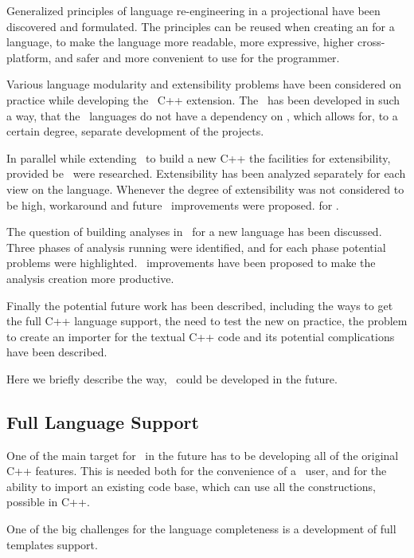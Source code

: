 Generalized principles of language re-engineering in a projectional  have been
discovered and formulated. The principles can be reused when creating an  for 
a language, to make the language more readable, more expressive, higher cross-platform,
and safer and more convenient to use for the programmer. 

Various language modularity and extensibility problems have been considered on 
practice while developing the \mbdr\ C++ extension. The \pcpp\ has been developed in 
such a way, that the \mbdp\ languages do not have a dependency on \pcpp, which
allows for, to a certain degree, separate development of the projects.

In parallel  while extending \mbdr\ to build a new C++  the facilities 
for extensibility, provided be \jbmps\ were researched. Extensibility has been 
analyzed separately for each view on the language. Whenever the degree of extensibility 
was not considered to be high, workaround and future \jbmps\ improvements were proposed.
for \jbmps.

The question of building analyses in \jbmps\ for a new language has been discussed.
Three phases of analysis running were identified, and for each phase potential problems
were highlighted. \jbmps\ improvements have been proposed to make the analysis creation 
more productive.

Finally the potential future work has been described, including the ways to get the full C++ language 
support, the need to test the new  on practice, the problem to create an importer for the
textual C++ code and its potential complications have been described.


Here we briefly describe the way, \pcpp\ could be developed in the future.

\subsection{Full Language Support}

One of the main target for \pcpp\ in the future has to be developing 
all of the original C++ features. This is needed both for the convenience of 
a \pcpp\ user, and for the ability to import an existing code base, which 
can use all the constructions, possible in C++.

One of the big challenges for the language completeness is a development 
of full templates support.

